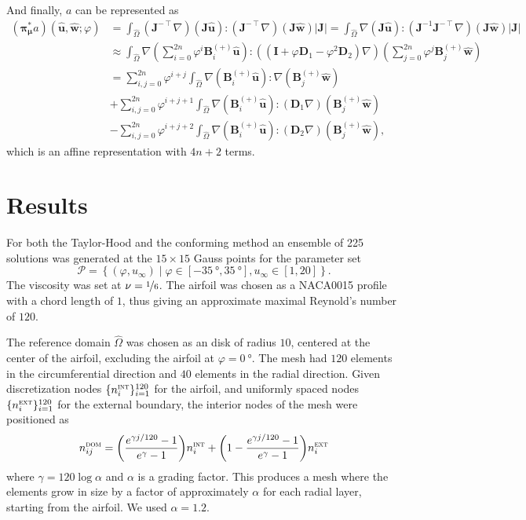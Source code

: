 \documentclass[onecolumn, twoside, a4paper, 11pt]{article}
\begin{document}
And finally, $a$ can be represented as
\begin{align}
  \nonumber
  ({\bm\pi}^*_{\bm\mu}a)(
    \hat{\bm u},
    \hat{\bm w};
    \varphi
  ) &= \int_{\hat{\Omega}}
      (\bm J^{-\intercal} \nabla) (\bm J \hat{\bm u}) :
      (\bm J^{-\intercal} \nabla) (\bm J \hat{\bm w}) |\bm J|
    = \int_{\hat{\Omega}}
      \nabla (\bm J \hat{\bm u}) :
      (\bm J^{-1} \bm J^{-\intercal} \nabla) (\bm J \hat{\bm w}) |\bm J| \\
  \nonumber
    &\approx \int_{\hat{\Omega}}
      \nabla \left( \sum_{i=0}^{2n} \varphi^i \bm B^{(+)}_i \hat{\bm u} \right) :
      ((\bm I + \varphi \bm D_1 - \varphi^2 \bm D_2) \nabla)
      \left( \sum_{j=0}^{2n} \varphi^j \bm B^{(+)}_j \hat{\bm w} \right) \\
  \nonumber
    &= \sum_{i,j=0}^{2n} \varphi^{i+j} \int_{\hat{\Omega}}
      \nabla (\bm B^{(+)}_i \hat{\bm u}) : \nabla (\bm B^{(+)}_j \hat{\bm w}) \\
  \nonumber
    &+ \sum_{i,j=0}^{2n} \varphi^{i+j+1} \int_{\hat{\Omega}}
      \nabla (\bm B^{(+)}_i \hat{\bm u}) : (\bm D_1 \nabla) (\bm B^{(+)}_j \hat{\bm w}) \\
    &- \sum_{i,j=0}^{2n} \varphi^{i+j+2} \int_{\hat{\Omega}}
      \nabla (\bm B^{(+)}_i \hat{\bm u}) : (\bm D_2 \nabla) (\bm B^{(+)}_j \hat{\bm w}),
\end{align}
which is an affine representation with $4n+2$ terms.

\section{Results}
\label{sec:results}

For both the Taylor-Hood and the conforming method an ensemble of 225 solutions was generated at
the $15 \times 15$ Gauss points for the parameter set
\[
  \mathcal{P} = \left\{ (\varphi,u_\infty) \;|\;
    \varphi \in [-\SI{35}{\degree},\SI{35}{\degree}],
    u_\infty \in [1, 20]
  \right\}.
\]
The viscosity was set at $\nu = \nicefrac{1}{6}$. The airfoil was chosen as a
NACA0015 profile with a chord length of $1$, thus giving an approximate maximal
Reynold's number of $120$.

The reference domain $\hat{\Omega}$ was chosen as an disk of radius $10$, centered at the
center of the airfoil, excluding the airfoil at $\varphi=\SI{0}{\degree}$. The mesh had
$120$ elements in the circumferential direction and $40$ elements in the
radial direction. Given discretization nodes $\{n^{\textsc{int}}_i\}_{i=1}^{120}$ for the airfoil, and uniformly
spaced nodes $\{n^{\textsc{ext}}_i\}_{i=1}^{120}$ for the external boundary, the interior nodes of the mesh were
positioned as
%
\begin{equation}
  \label{eqn:meshgen}
  n^{\textsc{dom}}_{ij} = \bigg(\frac{e^{\gamma j / 120} - 1}{e^{\gamma} - 1}\bigg) n^{\textsc{int}}_i
  + \bigg(1 - \frac{e^{\gamma j / 120} - 1}{e^{\gamma} - 1}\bigg) n^{\textsc{ext}}_i
\end{equation}
%
where $\gamma = 120 \log{\alpha}$ and $\alpha$ is a grading factor. This produces a mesh where the elements
grow in size by a factor of approximately $\alpha$ for each radial layer, starting from the airfoil. We
used $\alpha = 1.2$.
\end{document}
